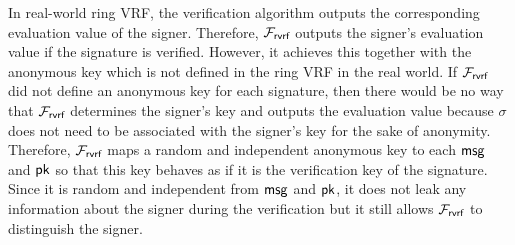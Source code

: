 	In real-world ring VRF, the verification algorithm outputs the corresponding evaluation value of the signer. Therefore, $ \mathcal{F}_{\textsf{rvrf}} $  outputs the signer's evaluation value if the signature is verified. However, it achieves this together with the anonymous key which is not defined in the ring VRF in the real world.  If $ \mathcal{F}_{\textsf{rvrf}} $ did not define an anonymous key for  each signature, then there would be no way that $ \mathcal{F}_{\textsf{rvrf}} $ determines the signer's key and outputs the evaluation value because $ \sigma $ does not need to be associated with the signer's key for the sake of anonymity. Therefore, $ \mathcal{F}_{\textsf{rvrf}} $ maps a random and independent anonymous key to each $ \mathsf{msg} $ and $ \mathsf{pk} $ so that this key behaves as if it is the verification key of the signature. Since it  is  random and independent from $ \mathsf{msg} $ and $ \mathsf{pk} $, it does not leak any information about the signer during the verification but it still allows $ \mathcal{F}_{\textsf{rvrf}} $ to distinguish the signer.
	
	
	
